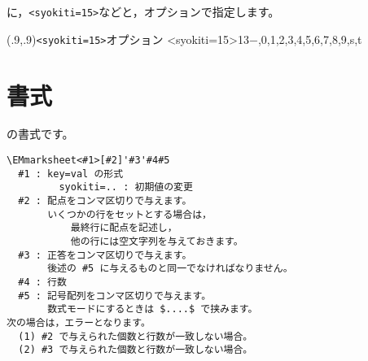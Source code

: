 \documentclass[a4j]{jarticle}
\begin{document}
に，\verb+<syokiti=15>+などと，オプションで指定します。

\begin{showEx}(.9,.9){\texttt{<syokiti=15>}オプション}
\EMmarksheet<syokiti=15>{13}{$-$,0,1,2,3,4,5,6,7,8,9,s,t}
\end{showEx}
\clearpage

\section{書式}
の書式です。

\begin{boxnote}
\begin{verbatim}
\EMmarksheet<#1>[#2]'#3'#4#5
  #1 : key=val の形式
         syokiti=.. : 初期値の変更
  #2 : 配点をコンマ区切りで与えます。
       いくつかの行をセットとする場合は，
           最終行に配点を記述し，
           他の行には空文字列を与えておきます。
  #3 : 正答をコンマ区切りで与えます。
       後述の #5 に与えるものと同一でなければなりません。
  #4 : 行数
  #5 : 記号配列をコンマ区切りで与えます。
       数式モードにするときは $....$ で挟みます。
次の場合は，エラーとなります。
  (1) #2 で与えられた個数と行数が一致しない場合。
  (2) #3 で与えられた個数と行数が一致しない場合。
\end{verbatim}
\end{boxnote}
\end{document}
